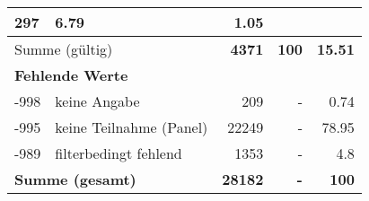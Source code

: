 \begin{longtable}{lXrrr}
       \num{297} &
       \num[round-mode=places,round-precision=2]{6.79} &
         \num[round-mode=places,round-precision=2]{1.05} \\
     \midrule
     \multicolumn{2}{l}{Summe (gültig)} &
       \textbf{\num{4371}} &
     \textbf{\num{100}} &
       \textbf{\num[round-mode=places,round-precision=2]{15.51}} \\
     \multicolumn{5}{l}{\textbf{Fehlende Werte}}\\
       -998 &
       keine Angabe &
         \num{209} &
        - &
         \num[round-mode=places,round-precision=2]{0.74} \\
       -995 &
       keine Teilnahme (Panel) &
         \num{22249} &
        - &
         \num[round-mode=places,round-precision=2]{78.95} \\
       -989 &
       filterbedingt fehlend &
         \num{1353} &
        - &
         \num[round-mode=places,round-precision=2]{4.8} \\
     \midrule
     \multicolumn{2}{l}{\textbf{Summe (gesamt)}} &
          \textbf{\num{28182}} &
        \textbf{-} &
        \textbf{\num{100}} \\
     \bottomrule
     \end{longtable}
     
